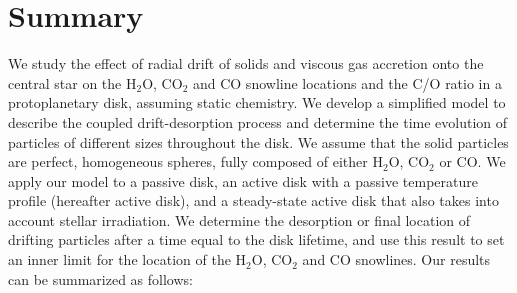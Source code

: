 \documentclass[apj]{emulateapj}
\begin{document}
\section{Summary}
\label{sec:summary}

We study the effect of radial drift of solids and viscous gas accretion onto the central star on the H$_2$O, CO$_2$ and CO snowline locations and the C/O ratio in a protoplanetary disk, assuming static chemistry. We develop a simplified model to describe the coupled drift-desorption process and determine the time evolution of particles of different sizes throughout the disk. We assume that the solid particles are perfect, homogeneous spheres, fully composed of either H$_2$O, CO$_2$ or CO. We apply our model to a passive disk, an active disk with a passive temperature profile (hereafter active disk), and a steady-state active disk that also takes into account stellar irradiation. We determine the desorption or final location of drifting particles after a time equal to the disk lifetime, and use this result to set an inner limit for the location of the H$_2$O, CO$_2$ and CO snowlines. Our results can be summarized as follows:
\end{document}
